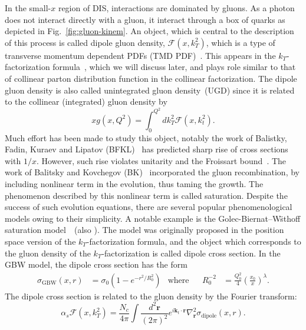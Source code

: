 \documentclass[12pt]{article}
\numberwithin{equation}{section}
\numberwithin{table}{section}
\numberwithin{figure}{section}
\newcommand{\comment}[1]{\texttt{\color{red}#1}}
\begin{document}
In the small-$x$ region of DIS, interactions are dominated by gluons\cite{Kovchegov:2012mbw}. As a photon does not interact directly with a gluon, it interact through a box of quarks as depicted in Fig.~\ref{fig:gluon-kinem}. 
An object, which is central to the description of this process is called dipole gluon density, $\mathcal{F}(x,k_T^2)$, which is a type of transverse momentum dependent PDFs (TMD PDF)~\cite{Dominguez:2010xd,Dominguez:2011wm,Xiao:2017yya}. This appears in the $k_T$-factorization formula~\cite{Dominguez:2010xd,Dominguez:2011wm,Xiao:2017yya}, which we will discuss later, and plays role similar to that of collinear parton distribution function in the collinear factorization.
The dipole gluon density is also called unintegrated gluon density~(UGD) since it is related to the collinear (integrated) gluon density by
\begin{equation}
xg(x,Q^2)=\int^{Q^2}_0 dk_T^2 \mathcal{F}(x,k^2_t).
\end{equation}
Much effort has been made to study this object, notably the work of Balistky, Fadin, Kuraev and Lipatov (BFKL)~\cite{Balitsky:1978ic, Kuraev:1977fs} has predicted sharp rise of cross sections with $1/x$.  However, such rise violates unitarity and the Froissart bound~\cite{Kovchegov:2012mbw,Barone:1993sy}. The work of Balitsky and Kovchegov (BK)~\cite{Balitsky:1995ub,Kovchegov:1999yj} incorporated the gluon recombination, by including nonlinear term in the evolution, thus taming the growth. The phenomenon described by this nonlinear term is called saturation.
Despite the success of such evolution equations, there are several popular phenomenological models owing to their simplicity. A notable example is the Golec-Biernat--W\"sthoff saturation model~\cite{Golec-Biernat:1998zce}~(also \cite{Kowalski:2003hm,McLerran:1993ni,Forshaw:1999uf,Iancu:2003ge}). The model was originally proposed in the position space version of the $k_T$-factorization formula, and the object which corresponds to the gluon density of the $k_T$-factorization is called dipole cross section.
In the GBW model, the dipole cross section has the form~\cite{Golec-Biernat:1998zce}
\begin{align}
\sigma_{\mathrm{GBW}}(x,r)&=\sigma_0\left(1-e^{-r^2/R^2_0}\right)&\mathrm{where}&
&R^{-2}_0&=\frac{Q_0^{2}}{4}\left(\frac{x_0}{x}\right)^\lambda.
\end{align}
The dipole cross section is related to the gluon density by the Fourier transform: 
\begin{equation}
\alpha_s\mathcal{F}(x,k_T^2)=\frac{N_c}{4\pi}\int\frac{d^2\mathbf{r}}{(2\pi)^2}e^{i\mathbf{k}_t\cdot \mathbf{r} }\nabla_{\mathbf{r}}^2\sigma_{\mathrm{dipole}}(x,r).
\label{eq:dipole-gluon}
\end{equation}
\end{document}
